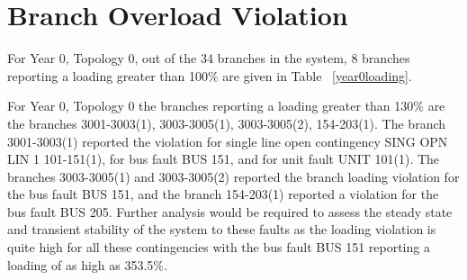 \documentclass{report}
\begin{document}
\section{Branch Overload Violation}
For Year 0, Topology 0, out of the 34 branches in the system, 8 branches reporting a loading greater than 100\% are given in Table ~\ref{year0loading}. 

\begin{table}[H]
\caption{Loading Violations Year 0 Topology 0}
\label{year0loading}
\centering
{}
\end{table}

For Year 0, Topology 0 the branches reporting a loading greater than 130\% are the branches 3001-3003(1), 3003-3005(1), 3003-3005(2), 154-203(1). The branch 3001-3003(1) reported the violation for single line open contingency SING OPN LIN   1 101-151(1), for bus fault BUS 151, and for unit fault UNIT 101(1). The branches 3003-3005(1) and 3003-3005(2) reported the branch loading violation for the bus fault BUS 151, and the branch 154-203(1) reported a violation for the bus fault BUS 205. Further analysis would be required to assess the steady state and transient stability of the system to these faults as the loading violation is quite high for all these contingencies with the bus fault BUS 151 reporting a loading of as high as 353.5\%.  
\end{document}

